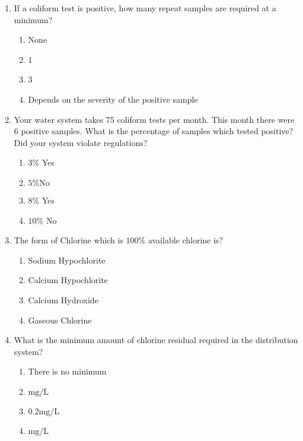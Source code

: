 \documentclass{article}
\begin{document}
\begin{enumerate}
\item  If a coliform test is positive, how many repeat samples are required at a minimum?\\
\begin{enumerate}
\item None\\
\item 1\\
\item 3\\
\item Depends on the severity of the positive sample
\end{enumerate}

\item  Your water system takes 75 coliform tests per month. This month there were 6 positive samples. What is the percentage of samples which tested positive? Did your system violate regulations?\\
\begin{enumerate}
\item $3 \%$ Yes\\
\item $5 \% \mathrm{No}$\\
\item $8 \%$ Yes\\
\item $10 \%$ No
\end{enumerate}

  \item The form of Chlorine which is $100 \%$ available chlorine is?\\
\begin{enumerate}
\item Sodium Hypochlorite\\
\item Calcium Hypochlorite\\
\item Calcium Hydroxide\\
\item Gaseous Chlorine
\end{enumerate}

\item  What is the minimum amount of chlorine residual required in the distribution system?\\
\begin{enumerate}
\item There is no minimum\\
\item $\mathrm{mg} / \mathrm{L}$\\
\item $0.2 \mathrm{mg} / \mathrm{L}$\\
\item $\mathrm{mg} / \mathrm{L}$
\end{enumerate}


\end{enumerate}
\end{document}
